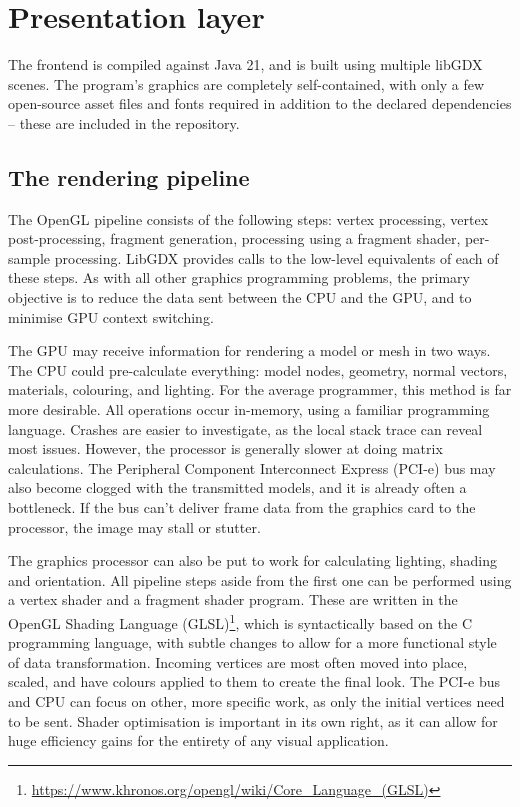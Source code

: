 \chapter{Presentation layer}

The frontend is compiled against Java 21, and is built using multiple libGDX scenes. The program's graphics are completely self-contained, with only a few open-source asset files and fonts required in addition to the declared dependencies -- these are included in the repository.

\section{The rendering pipeline}

The OpenGL pipeline consists of the following steps: vertex processing, vertex post-processing, fragment generation, processing using a fragment shader, per-sample processing\cite{OpenglPipeline}. LibGDX provides calls to the low-level equivalents of each of these steps. As with all other graphics programming problems, the primary objective is to reduce the data sent between the CPU and the GPU, and to minimise GPU context switching.

The GPU may receive information for rendering a model or mesh in two ways. The CPU could pre-calculate everything: model nodes, geometry, normal vectors, materials, colouring, and lighting. For the average programmer, this method is far more desirable. All operations occur in-memory, using a familiar programming language. Crashes are easier to investigate, as the local stack trace can reveal most issues. However, the processor is generally slower at doing matrix calculations. The Peripheral Component Interconnect Express (PCI-e) bus may also become clogged with the transmitted models, and it is already often a bottleneck. If the bus can't deliver frame data from the graphics card to the processor, the image may stall or stutter.

The graphics processor can also be put to work for calculating lighting, shading and orientation. All pipeline steps aside from the first one can be performed using a vertex shader and a fragment shader program. These are written in the OpenGL Shading Language (GLSL)\footnote{\url{https://www.khronos.org/opengl/wiki/Core_Language_(GLSL)}}, which is syntactically based on the C programming language, with subtle changes to allow for a more functional style of data transformation. Incoming vertices are most often moved into place, scaled, and have colours applied to them to create the final look. The PCI-e bus and CPU can focus on other, more specific work, as only the initial vertices need to be sent. Shader optimisation is important in its own right, as it can allow for huge efficiency gains for the entirety of any visual application.

